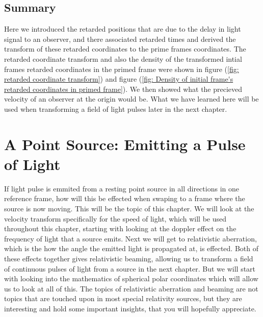 
\section{Summary}

Here we introduced the retarded positions that are due to the delay in light signal to an observer, and there associated retarded times and derived the transform of these retarded coordinates to the prime frames coordinates.
The retarded coordinate transform and also the density of the transformed intial frames retarded coordinates in the primed frame were shown in figure (\ref{fig: retarded coordinate transform}) and figure (\ref{fig: Density of initial frame's retarded coordinates in primed frame}).
We then showed what the precieved velocity of an observer at the origin would be.
What we have learned here will be used when transforming a field of light pulses later in the next chapter.



\printbibliography[segment=\therefsegment, heading=subbibliography]

\chapter{A Point Source: Emitting a Pulse of Light} \label{ch: A Point Source Emitting a Pulse of Light}

If light pulse is emmited from a resting point source in all directions in one reference frame, how will this be effected when swaping to a frame where the source is now moving.
This will be the topic of this chapter.
We will look at the velocity transform specifically for the speed of light, which will be used throughout this chapter, starting with looking at the doppler effect on the frequency of light that a source emits.
Next we will get to relativistic aberration, which is the how the angle the emitted light is propagated at, is effected.
Both of these effects together gives relativistic beaming, allowing us to transform a field of continuous pulses of light from a source in the next chapter.
But we will start with looking into the mathematics of spherical polar coordinates which will allow us to look at all of this.
The topics of relativistic aberration and beaming are not topics that are touched upon in most special relativity sources, but they are interesting and hold some important insights, that you will hopefully appreciate.

